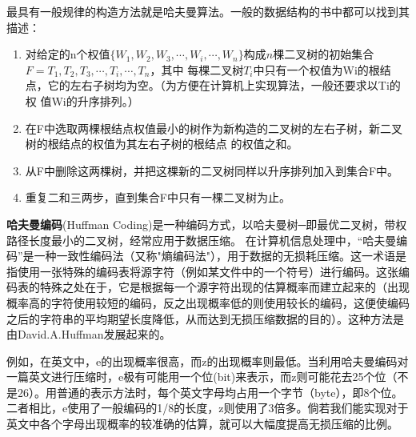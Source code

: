 \documentclass[12pt,a4paper]{article}
\begin{document}
最具有一般规律的构造方法就是哈夫曼算法。一般的数据结构的书中都可以找到其描述：
\begin{enumerate}
  \item 对给定的n个权值$\{W_1,W_2,W_3,\cdots,W_i,\cdots,W_n\}$构成$n$棵二叉树的初始集合$F={T_1,T_2,T_3,\cdots,T_i,\cdots,T_n}$，其中
每棵二叉树$T_i$中只有一个权值为Wi的根结点，它的左右子树均为空。（为方便在计算机上实现算法，一般还要求以Ti的权
值Wi的升序排列。）
\item 在F中选取两棵根结点权值最小的树作为新构造的二叉树的左右子树，新二叉树的根结点的权值为其左右子树的根结点
的权值之和。
\item 从F中删除这两棵树，并把这棵新的二叉树同样以升序排列加入到集合F中。
\item 重复二和三两步，直到集合F中只有一棵二叉树为止。
\end{enumerate}

\textbf{哈夫曼编码}(Huffman Coding)是一种编码方式，以哈夫曼树─即最优二叉树，带权路径长度最小的二叉树，经常应用于数据压缩。 在计算机信息处理中，“哈夫曼编码”是一种一致性编码法（又称"熵编码法"），用于数据的无损耗压缩。这一术语是指使用一张特殊的编码表将源字符（例如某文件中的一个符号）进行编码。这张编码表的特殊之处在于，它是根据每一个源字符出现的估算概率而建立起来的（出现概率高的字符使用较短的编码，反之出现概率低的则使用较长的编码，这便使编码之后的字符串的平均期望长度降低，从而达到无损压缩数据的目的）。这种方法是由David.A.Huffman发展起来的。

例如，在英文中，e的出现概率很高，而z的出现概率则最低。当利用哈夫曼编码对一篇英文进行压缩时，e极有可能用一个位(bit)来表示，而z则可能花去25个位（不是26）。用普通的表示方法时，每个英文字母均占用一个字节（byte），即8个位。二者相比，e使用了一般编码的1/8的长度，z则使用了3倍多。倘若我们能实现对于英文中各个字母出现概率的较准确的估算，就可以大幅度提高无损压缩的比例。
\end{document}

